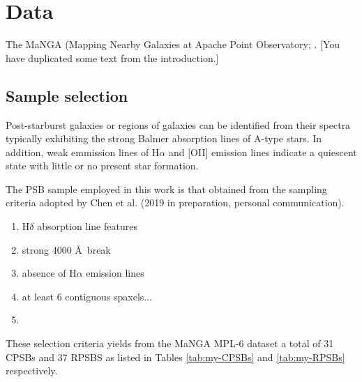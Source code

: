 \section{Data}
\label{sec:sample}
The MaNGA (Mapping Nearby Galaxies at Apache Point Observatory; \citet{2015ApJ...798....7B}. [You have duplicated some text from the introduction.]


\subsection{Sample selection}
Post-starburst galaxies or regions of galaxies can be identified from their spectra typically exhibiting the strong Balmer absorption lines of A-type stars. In addition, weak emmission lines of H$\alpha$ and [OII] emission lines indicate a quiescent state with little or no present star formation. 

The PSB sample employed in this work is that obtained from the sampling criteria adopted by Chen et al. (2019 in preparation, personal communication).

\begin{enumerate}
    \item H$\delta$ absorption line features
    \item strong 4000 \AA\ break 
    \item absence of H$\alpha$ emission lines
    \item at least 6 contiguous spaxels...
    \item 
\end{enumerate}

These selection criteria yields from the MaNGA MPL-6 dataset a total of 31 CPSBs and 37 RPSBS as listed in Tables \ref{tab:my-CPSBs} and \ref{tab:my-RPSBs} respectively. 

